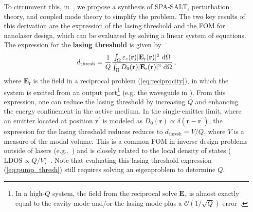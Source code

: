 To circumvent this, in~\cite{ownpub4}, we propose a synthesis of SPA-SALT, perturbation theory, and coupled mode theory to simplify the problem. 
The two key results of this derivation are the expression of the lasing threshold and the FOM for nanolaser design, which can be evaluated by solving a linear system of equations.
The expression for the \textbf{lasing threshold} is given by~\cite{ownpub4}
\begin{equation}\label{eq:pump_thresh}
 d_\text{thresh}  = \frac{1}{Q} \frac{\int_{\Omega} \varepsilon_c(\mathbf{r})|\mathbf{E}_{\text{r}}(\mathbf{r})|^2\, \mathop{}\!\text{d} \Omega}{\int_{\Omega} D_0(\mathbf{r}) |\mathbf{E}_{\text{r}}(\mathbf{r})|^2\, \mathop{}\!\text{d} \Omega}\,,
\end{equation}
where $\mathbf{E}_\text{r}$ is the field in a reciprocal problem (\eqref{eq:reciprocity}), in which the system is excited from an output port\footnote{In a high-$Q$ system, the field from the reciprocal solve $\mathbf{E}_r$ is almost exactly equal to the cavity mode and/or the lasing mode plus a $\mathcal{O}(1/\sqrt{Q})$ error~\cite{phot_crys}.} (e.g. the waveguide in ). From this expression, one can reduce the lasing threshold by increasing $Q$ and enhancing the energy confinement in the
active medium. In the single-emitter limit, where an emitter located at position \(\mathbf{r}^\prime\) is modeled as 
\(D_0(\mathbf{r}) \propto \delta(\mathbf{r} - \mathbf{r}^\prime)\), 
the expression for the lasing threshold reduces  reduces to \(d_{\text{thresh}} = V / Q\), where $V$ is a measure of the modal volume. This is a common FOM in inverse design problems outside of lasers (e.g.,~\cite{LDOS_opt_wang}) and is closely
related to the local density of states ($ \text{LDOS} \propto Q/V$)~\cite{LDOS_opt_wang}.
   Note that evaluating this lasing threshold expression (\eqref{eq:pump_thresh}) still requires solving an eigenproblem to determine \(Q\).


